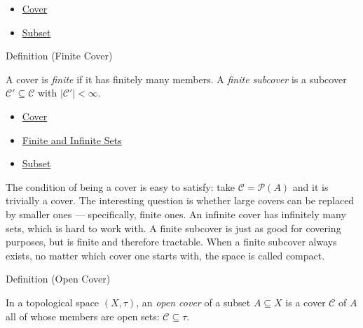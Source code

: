 \begin{dependencies}
\begin{itemize}
  \item \hyperref[def:cover-full]{Cover}
  \item \hyperref[def:subset]{Subset}
\end{itemize}
\end{dependencies}

\begin{definitionbox}{Definition (Finite Cover)}
\begin{definition}\label{def:finite-cover}
A cover is \emph{finite} if it has finitely many members. A \emph{finite
subcover} is a subcover $\mathcal{C}' \subseteq \mathcal{C}$ with
$|\mathcal{C}'| < \infty$.
\end{definition}
\end{definitionbox}

\begin{dependencies}
\begin{itemize}
  \item \hyperref[def:cover-full]{Cover}
  \item \hyperref[def:finite-infinite]{Finite and Infinite Sets}
  \item \hyperref[def:subset]{Subset}
\end{itemize}
\end{dependencies}

\begin{remark*}
The condition of being a cover is easy to satisfy: take $\mathcal{C} =
\mathcal{P}(A)$ and it is trivially a cover. The interesting question is
whether large covers can be replaced by smaller ones --- specifically, finite
ones. An infinite cover has infinitely many sets, which is hard to work with.
A finite subcover is just as good for covering purposes, but is finite and
therefore tractable. When a finite subcover always exists, no matter which
cover one starts with, the space is called compact.
\end{remark*}

\begin{definitionbox}{Definition (Open Cover)}
\begin{definition}\label{def:open-cover}
In a topological space $(X, \tau)$, an \emph{open cover} of a subset $A
\subseteq X$ is a cover $\mathcal{C}$ of $A$ all of whose members are open
sets: $\mathcal{C} \subseteq \tau$.
\end{definition}
\end{definitionbox}

